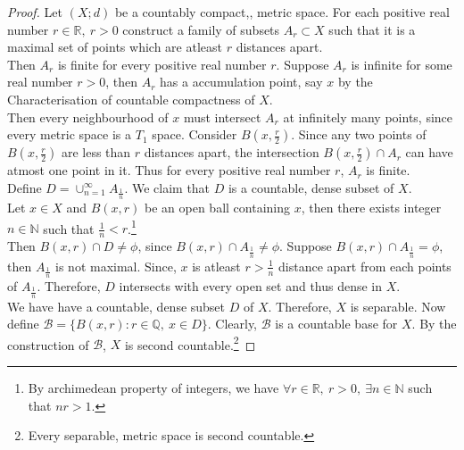 \begin{proof}
	Let $(X;d)$ be a countably compact,, metric space. For each positive real number $r \in \mathbb{R},\ r > 0$ construct a family of subsets $A_r \subset X$ such that it is a maximal set of points which are atleast $r$ distances apart.\\

	Then $A_r$ is finite for every positive real number $r$. Suppose $A_r$ is infinite for some real number $r > 0$, then $A_r$ has a accumulation point, say $x$ by the Characterisation of countable compactness of $X$.\\

	Then every neighbourhood of $x$ must intersect $A_r$ at infinitely many points, since every metric space is a $T_1$ space. Consider $B(x,\frac{r}{2})$. Since any two points of $B(x,\frac{r}{2})$ are less than $r$ distances apart, the intersection $B(x,\frac{r}{2}) \cap A_r$ can have atmost one point in it. Thus for every positive real number $r$, $A_r$ is finite.\\

	Define $D = \cup_{n = 1}^\infty A_\frac{1}{n}$. We claim that $D$ is a countable, dense subset of $X$.\\

	Let $x \in X$ and $B(x,r)$ be an open ball containing $x$, then there exists integer $n \in \mathbb{N}$ such that $\frac{1}{n} < r$.\footnote{By archimedean property of integers, we have $\forall r \in \mathbb{R},\ r>0,\ \exists n \in \mathbb{N}$ such that $nr > 1$.}\\

	Then $B(x,r) \cap D \ne \phi$, since $B(x,r) \cap A_\frac{1}{n} \ne \phi$. Suppose $B(x,r) \cap A_\frac{1}{n} = \phi$, then $A_\frac{1}{n}$ is not maximal. Since, $x$ is atleast $r > \frac{1}{n}$ distance apart from each points of $A_\frac{1}{n}$. Therefore, $D$ intersects with every open set and thus dense in $X$.\\

	We have have a countable, dense subset $D$ of $X$. Therefore, $X$ is separable. Now define $\mathcal{B} = \{ B(x,r) : r \in \mathbb{Q},\ x \in D \}$. Clearly, $\mathcal{B}$ is a countable base for $X$. By the construction of $\mathcal{B}$, $X$ is second countable.\footnote{Every separable, metric space is second countable.}
\end{proof}

